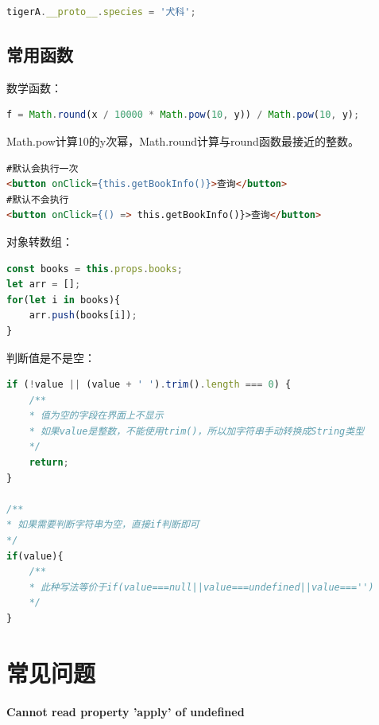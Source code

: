 \documentclass[letter]{book}
\begin{document}
\begin{lstlisting}[language=Javascript]
tigerA.__proto__.species = '犬科';
\end{lstlisting}





\subsection{常用函数}

数学函数：

\begin{lstlisting}[language=Javascript]
f = Math.round(x / 10000 * Math.pow(10, y)) / Math.pow(10, y);
\end{lstlisting}

Math.pow计算10的y次幂，Math.round计算与round函数最接近的整数。

\begin{lstlisting}[language=HTML]
#默认会执行一次
<button onClick={this.getBookInfo()}>查询</button>
#默认不会执行
<button onClick={() => this.getBookInfo()}>查询</button>
\end{lstlisting}

对象转数组：

\begin{lstlisting}[language=Javascript]
const books = this.props.books;
let arr = [];
for(let i in books){
	arr.push(books[i]);
}
\end{lstlisting}

判断值是不是空：

\begin{lstlisting}[language=Javascript]
if (!value || (value + ' ').trim().length === 0) {
	/**
	* 值为空的字段在界面上不显示
	* 如果value是整数，不能使用trim()，所以加字符串手动转换成String类型
	*/
	return;
}

/**
* 如果需要判断字符串为空，直接if判断即可
*/
if(value){
	/**
	* 此种写法等价于if(value===null||value===undefined||value==='')
	*/
}
\end{lstlisting}



\section{常见问题}

\paragraph{Cannot read property 'apply' of undefined}
\end{document}
